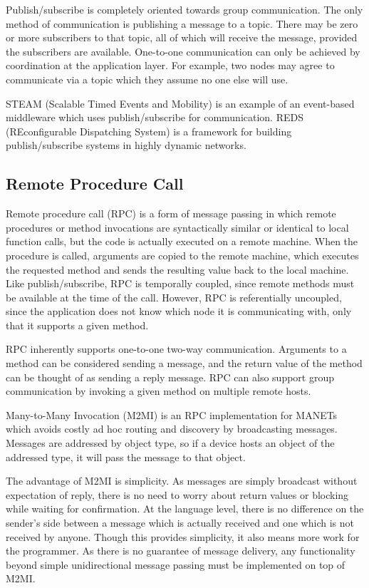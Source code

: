Publish/subscribe is completely oriented towards group communication. The only method of communication is publishing a message to a topic. There may be zero or more subscribers to that topic, all of which will receive the message, provided the subscribers are available. One-to-one communication can only be achieved by coordination at the application layer. For example, two nodes may agree to communicate via a topic which they assume no one else will use.

STEAM (Scalable Timed Events and Mobility)\cite{steam} is an example of an event-based middleware which uses publish/subscribe for communication. REDS (REconfigurable Dispatching System) is a framework for building publish/subscribe systems in highly dynamic networks.

\subsection{Remote Procedure Call}

Remote procedure call (RPC) is a form of message passing in which remote procedures or method invocations are syntactically similar or identical to local function calls, but the code is actually executed on a remote machine. When the procedure is called, arguments are copied to the remote machine, which executes the requested method and sends the resulting value back to the local machine. Like publish/subscribe, RPC is temporally coupled, since remote methods must be available at the time of the call. However, RPC is referentially uncoupled, since the application does not know which node it is communicating with, only that it supports a given method.

RPC inherently supports one-to-one two-way communication. Arguments to a method can be considered sending a message, and the return value of the method can be thought of as sending a reply message. RPC can also support group communication by invoking a given method on multiple remote hosts.

Many-to-Many Invocation (M2MI)\cite{m2mi} is an RPC implementation for MANETs which avoids costly ad hoc routing and discovery by broadcasting messages. Messages are addressed by object type, so if a device hosts an object of the addressed type, it will pass the message to that object.

The advantage of M2MI is simplicity. As messages are simply broadcast without expectation of reply, there is no need to worry about return values or blocking while waiting for confirmation. At the language level, there is no difference on the sender's side between a message which is actually received and one which is not received by anyone. Though this provides simplicity, it also means more work for the programmer. As there is no guarantee of message delivery, any functionality beyond simple unidirectional message passing must be implemented on top of M2MI.

